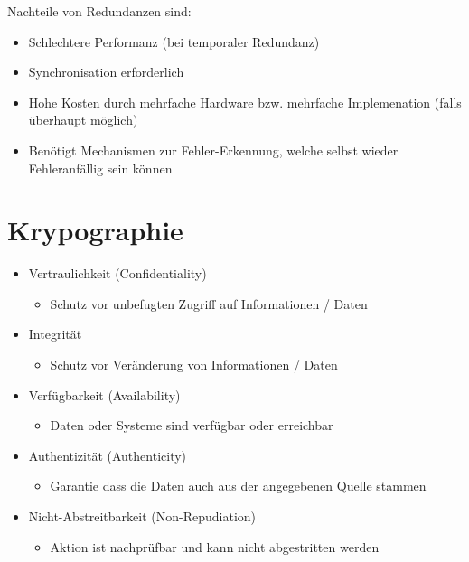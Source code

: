 \documentclass[a4paper,12pt,leqno]{article}
\begin{document}
Nachteile von Redundanzen sind:
\begin{itemize}
\item Schlechtere Performanz (bei temporaler Redundanz)
\item Synchronisation erforderlich
\item Hohe Kosten durch mehrfache Hardware bzw. mehrfache Implemenation (falls überhaupt möglich)
\item Benötigt Mechanismen zur Fehler-Erkennung, welche selbst wieder Fehleranfällig sein können
\end{itemize}

\section{Krypographie}
\begin{itemize}
\label{item:schutzziele}
\item Vertraulichkeit (Confidentiality)
	\begin{itemize}
	\item Schutz vor unbefugten Zugriff auf Informationen / Daten
	\end{itemize}
\item Integrität
	\begin{itemize}
	\item Schutz vor Veränderung von Informationen / Daten
	\end{itemize}
\item Verfügbarkeit (Availability)
	\begin{itemize}
	\item Daten oder Systeme sind verfügbar oder erreichbar
	\end{itemize}
\item Authentizität (Authenticity)
	\begin{itemize}
	\item Garantie dass die Daten auch aus der angegebenen Quelle stammen
	\end{itemize}
\item Nicht-Abstreitbarkeit (Non-Repudiation)
	\begin{itemize}
	\item Aktion ist nachprüfbar und kann nicht abgestritten werden
	\end{itemize}
\end{itemize}
\end{document}
